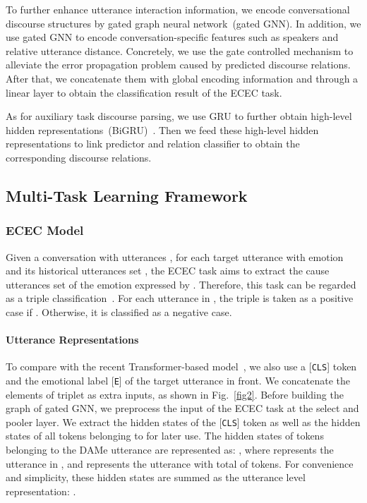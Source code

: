 \documentclass[11pt]{article}
\begin{document}
To further enhance utterance interaction information, we encode conversational discourse structures by gated graph neural network~(gated GNN).
In addition, we use gated GNN to encode conversation-specific features such as speakers and relative utterance distance.
Concretely, we use the gate controlled mechanism to alleviate the error propagation problem caused by predicted discourse relations.
After that, we concatenate them with global encoding information and through a linear layer to obtain the classification result of the ECEC task.

As for auxiliary task discourse parsing, 
we use GRU to further obtain high-level hidden representations~(BiGRU)~\cite{cho2014learning}. 
Then we feed these high-level hidden representations to link predictor and relation classifier to obtain the corresponding discourse relations.

\subsection{Multi-Task Learning Framework}

\subsubsection{ECEC Model}
Given a conversation with  utterances , 
for each target utterance  with emotion  and its historical utterances set , 
the ECEC task aims to extract the cause utterances set  of the emotion expressed by .
Therefore, this task can be regarded as a triple classification~\cite{poria2021recognizing}.
For each utterance  in , the triple  is taken as a positive case if .
Otherwise, it is classified as a negative case.

\paragraph{Utterance Representations}
To compare with the recent Transformer-based model~\cite{poria2021recognizing}, we also use a [\texttt{CLS}] token and the emotional label [\texttt{E}] of the target utterance in front.
We concatenate the elements of triplet as extra inputs, as shown in Fig.~\ref{fig2}. 
Before building the graph of gated GNN, we preprocess the input of the ECEC task at the select and pooler layer.
We extract the hidden states  of the [\texttt{CLS}] token as well as the hidden states of all tokens belonging to  for later use. 
The hidden states of tokens belonging to the DAMe utterance are represented as: ,
where  represents the  utterance in , and  represents the  utterance with total of  tokens.
For convenience and simplicity, these hidden states are summed as the utterance level representation: .
\end{document}
